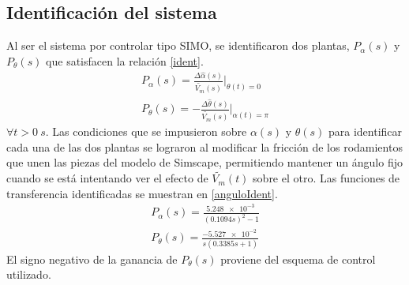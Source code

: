 \subsection{Identificación del sistema}
Al ser el sistema por controlar tipo SIMO, se identificaron dos plantas, $P_{\alpha}(s)$ y
$P_{\theta}(s)$ que satisfacen la relación \eqref{ident}.
\begin{equation}
    \begin{aligned}
        P_{\alpha}(s) = \frac{\Delta\hat{\alpha}(s)}{\widetilde{V_m}(s)}\Bigg|_{\theta(t)=0}\label{ident}\\
        P_{\theta}(s) = -\frac{\Delta\hat{\theta}(s)}{\widetilde{V_m}(s)}\Bigg|_{\alpha(t)=\pi}
    \end{aligned}
\end{equation}
    $\forall t > \SI{0}{s}$. Las condiciones que se impusieron sobre $\alpha(s)$ y $\theta(s)$ para identificar cada una de las dos plantas
    se lograron al modificar la fricción de los rodamientos que unen las piezas del modelo de Simscape, permitiendo mantener un ángulo fijo cuando se está intentando ver el efecto 
    de $\widetilde{V_m}(t)$ sobre el otro.
    Las funciones de transferencia identificadas se muestran en \eqref{anguloIdent}.
\begin{equation}
    \begin{aligned}
        P_{\alpha}(s) = \frac{ \SI{5.248e-3}{}}{(0.1094s)^2 - 1}\\\label{anguloIdent} 
        P_{\theta}(s) = \frac{ \SI{-5.527e-2}{}}{s(0.3385s + 1)}
    \end{aligned}
\end{equation}
El signo negativo de la ganancia de $P_{\theta}(s)$ proviene del esquema de control utilizado.
